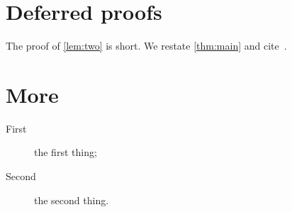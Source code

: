 \section{Deferred proofs}\label{app:proofs}

The proof of \cref{lem:two} is short. %
We restate \cref{thm:main} and cite~\cite{FakeA20}.

\section{More}\label{app:more}
\begin{description}
  \item[First] the first thing;
  \item[Second] the second thing.
\end{description}
